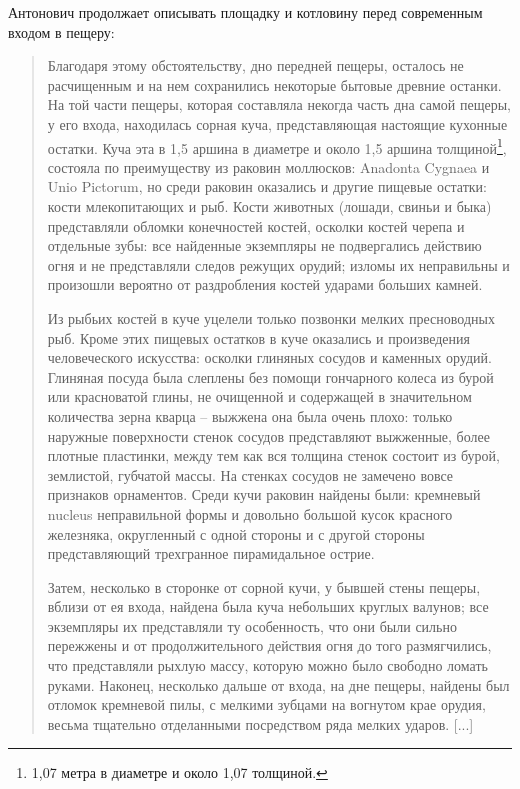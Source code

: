 Антонович продолжает описывать площадку и котловину перед современным входом в пещеру:

\begin{quotation}
Благодаря этому обстоятельству, дно передней пещеры, осталось не расчищенным и на нем сохранились некоторые бытовые древние останки. На той части пещеры, которая составляла некогда часть дна самой пещеры, у его входа, находилась сорная куча, представляющая настоящие кухонные остатки. Куча эта в 1,5 аршина в диаметре и около 1,5 аршина толщиной\footnote{1,07 метра в диаметре и около 1,07 толщиной.}, состояла по преимуществу из раковин моллюсков: Anadonta Cygnaea и Unio Pictorum, но среди раковин оказались и другие пищевые остатки: кости млекопитающих и рыб. Кости животных (лошади, свиньи и быка) представляли обломки конечностей костей, осколки костей черепа и отдельные зубы: все найденные экземпляры не подвергались действию огня и не представляли следов режущих орудий; изломы их неправильны и произошли вероятно от раздробления костей ударами больших камней.

Из рыбьих костей в куче уцелели только позвонки мелких пресноводных рыб. Кроме этих пищевых остатков в куче оказались и произведения человеческого искусства: осколки глиняных сосудов и каменных орудий. Глиняная посуда была слеплены без помощи гончарного колеса из бурой или красноватой глины, не очищенной и содержащей в значительном количества зерна кварца – выжжена она была очень плохо: только наружные поверхности стенок сосудов представляют выжженные, более плотные пластинки, между тем как вся толщина стенок состоит из бурой, землистой, губчатой массы. На стенках сосудов не замечено вовсе признаков орнаментов. Среди кучи раковин найдены были: кремневый nucleus неправильной формы и довольно большой кусок красного железняка, округленный с одной стороны и с другой стороны представляющий  трехгранное пирамидальное острие.

Затем, несколько в сторонке от сорной кучи, у бывшей стены пещеры, вблизи от ея входа, найдена была куча небольших круглых валунов; все экземпляры их представляли ту особенность, что они были сильно пережжены и от продолжительного действия огня до того размягчились, что представляли рыхлую массу, которую можно было свободно ломать руками. Наконец, несколько дальше от входа, на дне пещеры, найдены был отломок кремневой пилы, с мелкими зубцами на вогнутом крае орудия, весьма тщательно отделанными посредством ряда мелких ударов. [...]
\end{quotation}
  
